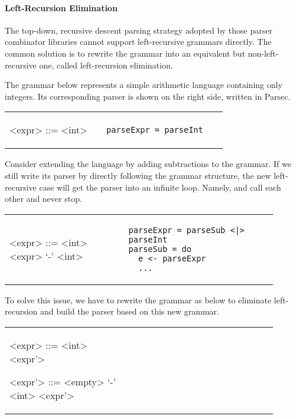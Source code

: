 \paragraph{Left-Recursion Elimination} The top-down, recursive descent parsing strategy adopted by those parser combinator libraries cannot support left-recursive grammars directly. The common solution is to rewrite the grammar into an equivalent but non-left-recursive one, called left-recursion elimination.

The grammar below represents a simple arithmetic language containing only integers. Its corresponding parser is shown on the right side, written in Parsec.

\begin{tabular}{m{0.4\linewidth}m{0.5\linewidth}}
\setlength{\grammarindent}{5em}
\begin{grammar}
<expr> ::= <int>
\end{grammar}
&
\begin{lstlisting}[language=PlainCode]
parseExpr = parseInt
\end{lstlisting}
\end{tabular}

Consider extending the language by adding subtractions to the grammar. If we still write its parser by directly following the grammar structure, the new left-recursive case will get the parser into an infinite loop. Namely,  and  call each other and never stop.

\begin{tabular}{m{0.4\linewidth}m{0.5\linewidth}}
\setlength{\grammarindent}{5em}
\begin{grammar}
<expr> ::= <int> \alt <expr> `-' <int>
\end{grammar}
&
\begin{lstlisting}[language=PlainCode]
parseExpr = parseSub <|> parseInt
parseSub = do
  e <- parseExpr
  ...
\end{lstlisting}
\end{tabular}

To solve this issue, we have to rewrite the grammar as below to eliminate left-recursion and build the parser based on this new grammar.\\

\begin{tabular}{m{0.4\linewidth}m{0.5\linewidth}}
\setlength{\grammarindent}{5em}
\begin{grammar}
<expr> ::= <int> <expr'>

<expr'> ::= <empty> \alt `-' <int> <expr'>
\end{grammar}
&
\end{tabular}

